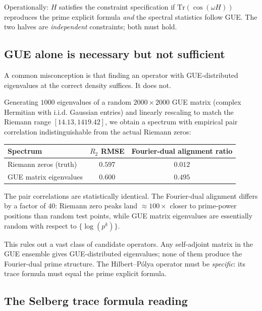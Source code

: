 \documentclass[11pt,a4paper]{article}
\theoremstyle{plain}
\theoremstyle{definition}
\theoremstyle{remark}
\begin{document}
Operationally: $H$ satisfies the constraint specification if
$\mathrm{Tr}(\cos(\omega H))$ reproduces the prime explicit formula
\emph{and} the spectral statistics follow GUE. The two halves are
\emph{independent} constraints; both must hold.

\subsection{GUE alone is necessary but not sufficient}
\label{sec:hp-gue-not-enough}

A common misconception is that finding an operator with GUE-distributed
eigenvalues at the correct density suffices. It does not.

Generating $1000$ eigenvalues of a random $2000 \times 2000$ GUE
matrix (complex Hermitian with i.i.d. Gaussian entries) and linearly
rescaling to match the Riemann range $[14.13, 1419.42]$, we obtain a
spectrum with empirical pair correlation indistinguishable from the
actual Riemann zeros:

\begin{center}
\begin{tabular}{lcc}
\toprule
Spectrum & $R_2$ RMSE & Fourier-dual alignment ratio \\
\midrule
Riemann zeros (truth) & $0.597$ & $0.012$ \\
GUE matrix eigenvalues & $0.600$ & $0.495$ \\
\bottomrule
\end{tabular}
\end{center}

The pair correlations are statistically identical. The Fourier-dual
alignment differs by a factor of $40$: Riemann zero peaks land
$\approx 100\times$ closer to prime-power positions than random
test points, while GUE matrix eigenvalues are essentially random
with respect to $\{\log(p^k)\}$.

This rules out a vast class of candidate operators. Any self-adjoint
matrix in the GUE ensemble gives GUE-distributed eigenvalues; none
of them produce the Fourier-dual prime structure. The Hilbert--Pólya
operator must be \emph{specific}: its trace formula must equal the
prime explicit formula.

\subsection{The Selberg trace formula reading}
\label{sec:hp-selberg}
\end{document}
